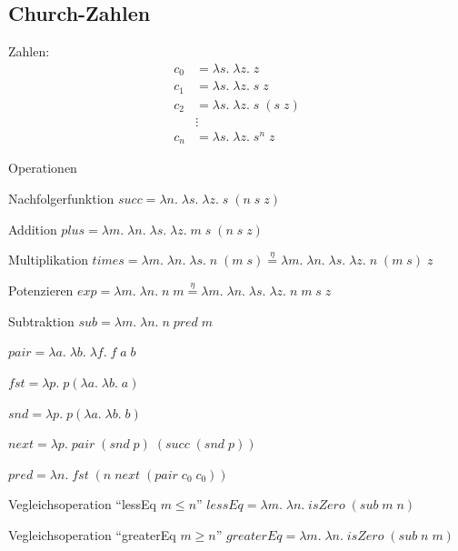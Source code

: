 \subsection{Church-Zahlen }
\begin{compactitem}
	\item Zahlen:
		\begin{align*}
			c_0 &= \lambda s.\; \lambda z.\; z\\
			c_1 &= \lambda s.\; \lambda z.\; s\; z\\
			c_2 &= \lambda s.\; \lambda z.\; s\; (s\; z)\\
				& \vdots \\
			c_n &= \lambda s.\; \lambda z.\; s^n\; z
		\end{align*}
	\item Operationen
		\begin{compactitem}
			\item Nachfolgerfunktion $succ = \lambda n.\; \lambda s.\; \lambda z.\; s\; (n\; s\; z)$
			\item Addition $plus = \lambda m.\; \lambda n.\; \lambda s.\; \lambda z.\; m\; s\; (n\; s\; z)$
			\item Multiplikation $times = \lambda m.\; \lambda n.\; \lambda s.\; n\; (m\; s) \overset{\eta}{=} \lambda m.\; \lambda n.\; \lambda s.\; \lambda z.\; n\; (m\; s)\; z$
			\item Potenzieren $exp = \lambda m.\; \lambda n.\; n\; m \overset{\eta}{=} \lambda m.\; \lambda n.\; \lambda s. \; \lambda z.\; n\; m\; s\; z$
			\item Subtraktion $sub = \lambda m.\; \lambda n.\; n\; pred\; m$
				\begin{compactitem}
					\item $pair = \lambda a.\; \lambda b.\; \lambda f.\; f\; a\; b$
					\item $fst = \lambda p.\; p (\lambda a.\; \lambda b.\; a)$
					\item $snd = \lambda p.\; p (\lambda a.\; \lambda b.\; b)$
					\item $next = \lambda p.\; pair\; (snd\; p)\; (succ\; (snd\; p))$
					\item $pred = \lambda n.\; fst\; (n\; next\; (pair\; c_0\; c_0))$
				\end{compactitem}
			\item Vegleichsoperation \enquote{lessEq $m \leq n$} $lessEq = \lambda m.\; \lambda n.\; isZero\; (sub\; m\; n)$
			\item Vegleichsoperation \enquote{greaterEq $m \geq n$} $greaterEq = \lambda m.\; \lambda n.\; isZero\; (sub\; n\; m)$

\end{compactitem}
\end{compactitem}
